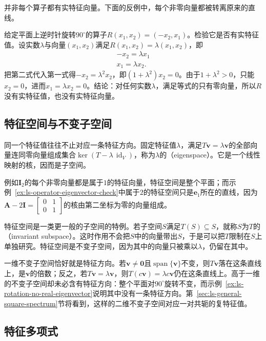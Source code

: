 并非每个算子都有实特征向量。下面的反例中，每个非零向量都被转离原来的直线。
\begin{example}[反例：平面旋转没有实特征向量]
\label{ex:ls-rotation-no-real-eigenvector}
给定平面上逆时针旋转$90^\circ$的算子$R(x_1,x_2)=(-x_2,x_1)$。检验它是否有实特征值。设实数$\lambda$与向量$(x_1,x_2)$满足$R(x_1,x_2)=\lambda(x_1,x_2)$，即
\[
 \begin{gathered}
-x_2=\lambda x_1\\
x_1=\lambda x_2 .
 \end{gathered}
\]
把第二式代入第一式得$-x_2=\lambda^2x_2$，即$(1+\lambda^2)x_2=0$。由于$1+\lambda^2>0$，只能$x_2=0$，进而$x_1=\lambda x_2=0$。结论：对任何实数$\lambda$，满足等式的只有零向量，所以$R$没有实特征值，也没有实特征向量。
\end{example}

\subsection{特征空间与不变子空间}

同一个特征值往往不止对应一条特征方向。固定特征值$\lambda$，满足$T\bm v=\lambda\bm v$的全部向量连同零向量组成集合$\ker(T-\lambda\,\operatorname{id}_V)$，称为$\lambda$的（eigenspace）。它是一个线性映射的核，因而是子空间。

例如$\bm I_2$的每个非零向量都是属于$1$的特征向量，特征空间是整个平面；而示例~\ref{ex:ls-operator-eigenvector-check}中属于$2$的特征空间只是$\bm e_1$所在的直线，因为$\bm A-2\bm I=\left[\begin{smallmatrix}0&1\\0&1\end{smallmatrix}\right]$的核由第二坐标为零的向量组成。

特征空间是一类更一般的子空间的特例。若子空间$S$满足$T(S)\subseteq S$，就称$S$为$T$的（invariant subspace）。这时作用不会把$S$中的向量带出$S$，于是可以把$T$限制在$S$上单独研究。特征空间是不变子空间，因为其中的向量只被乘以$\lambda$，仍留在其中。

一维不变子空间恰好就是特征方向。若$\bm v\neq\bm0$且$\operatorname{span}\{\bm v\}$不变，则$T\bm v$落在这条直线上，是$\bm v$的倍数；反之，若$T\bm v=\lambda\bm v$，则$T(c\bm v)=\lambda c\bm v$仍在这条直线上。高于一维的不变子空间却未必含有特征方向：整个平面对$90^\circ$旋转不变，而示例~\ref{ex:ls-rotation-no-real-eigenvector}说明其中没有一条特征方向。第~\ref{sec:ls-general-square-spectrum}节将看到，这样的二维不变子空间对应一对共轭的复特征值。

\subsection{特征多项式}
\label{sec:ls-characteristic-polynomial}

